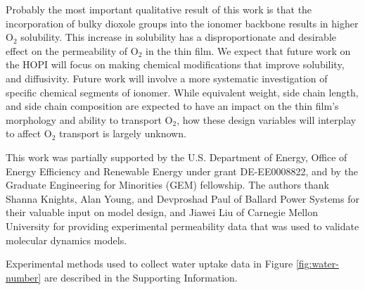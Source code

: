 \documentclass[journal=jacsat,manuscript=article]{achemso}
\begin{document}
Probably the most important qualitative result of this work is that the incorporation of bulky dioxole groups into the ionomer backbone results in higher O$_2$ solubility. This increase in solubility has a disproportionate and desirable effect on the permeability of O$_2$ in the thin film. We expect that future work on the HOPI will focus on making chemical modifications that improve solubility, and diffusivity. Future work will involve a more systematic investigation of specific chemical segments of ionomer. While equivalent weight, side chain length, and side chain composition are expected to have an impact on the thin film's morphology and ability to transport O$_2$, how these design variables will interplay to affect O$_2$ transport is largely unknown. 

\begin{acknowledgement}
This work was partially supported by the U.S. Department of Energy, Office of Energy Efficiency and Renewable Energy under grant DE-EE0008822, and by the Graduate Engineering for Minorities (GEM) fellowship. The authors thank Shanna Knights, Alan Young, and Devproshad Paul of Ballard Power Systems for their valuable input on model design, and Jiawei Liu of Carnegie Mellon University for providing experimental permeability data that was used to validate molecular dynamics models. 
\end{acknowledgement}

\begin{suppinfo}
Experimental methods used to collect water uptake data in Figure \ref{fig:water-number} are described in the Supporting Information.
\end{suppinfo}


\end{document}
